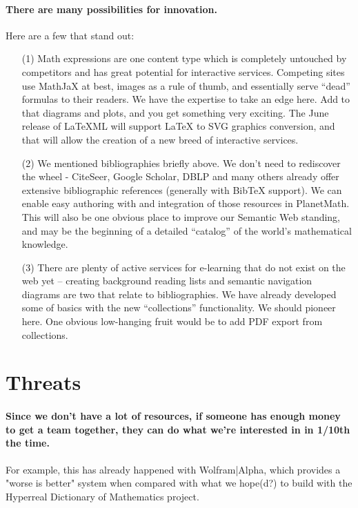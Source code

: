 \paragraph{There are many possibilities for innovation.}  Here are a few
that stand out: 
\begin{itemize}
\item[(1)] Math expressions are one content type which is completely
  untouched by competitors and has great potential for interactive
  services.  Competing sites use MathJaX at best, images as a rule of
  thumb, and essentially serve ``dead'' formulas to their readers.  We
  have the expertise to take an edge here.  Add to that diagrams and
  plots, and you get something very exciting.  The June release of
  \LaTeX ML will support LaTeX to SVG graphics conversion, and that
  will allow the creation of a new breed of interactive services.
\item[(2)] We mentioned bibliographies briefly above.  We don't need
  to rediscover the wheel - CiteSeer, Google Scholar, DBLP and many
  others already offer extensive bibliographic references (generally
  with BibTeX support).  We can enable easy authoring with and
  integration of those resources in PlanetMath.  This will also be one
  obvious place to improve our Semantic Web standing, and may be the
  beginning of a detailed ``catalog'' of the world's mathematical
  knowledge.
\item[(3)] There are plenty of active services for e-learning that do
  not exist on the web yet -- creating background reading lists and
  semantic navigation diagrams are two that relate to bibliographies.
  We have already developed some of basics with the new
  ``collections'' functionality.  We should pioneer here.  One obvious
  low-hanging fruit would be to add PDF export from collections.
\end{itemize}

\section*{Threats}

\paragraph{Since we don't have a lot of resources, if someone has enough
  money to get a team together, they can do what we're interested in
  in 1/10th the time.}  For example, this has already happened with
Wolfram|Alpha, which provides a "worse is better" system when compared
with what we hope(d?) to build with the Hyperreal Dictionary of
Mathematics project.

